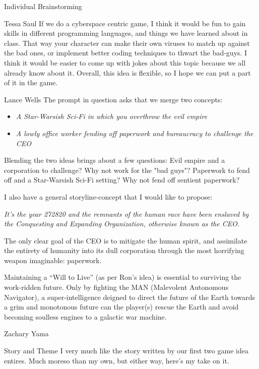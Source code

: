 \documentclass[12pt]{report}
\begin{document}
\begin{section}{Individual Brainstorming}
\begin{subsection}{Tessa Saul}
If we do a cyberspace centric game, I think it would be fun to gain skills
in different programming languages, and things we have learned about in
class. That way your character can make their own viruses to match up
against the bad ones, or implement better coding techniques to thwart the
bad-guys. I think it would be easier to come up with jokes about this topic
because we all already know about it. Overall, this idea is flexible, so I
hope we can put a part of it in the game.
\end{subsection}

\begin{subsection}{Lance Wells}
The prompt in question asks that we merge two concepts:
\begin{itemize}
\item \emph{A Star-Warsish Sci-Fi in which you overthrow the evil empire}
\item \emph{A lowly office worker fending off paperwork and bureaucracy to challenge the CEO}
\end{itemize}

Blending the two ideas brings about a few questions:
Evil empire and a corporation to challenge? Why not work for the "bad guys"?
Paperwork to fend off and a Star-Warsish Sci-Fi setting? Why not fend off 
sentient paperwork?

I also have a general storyline-concept that I would like to propose:

\begin{center}
\emph{It's the year 272820 and the remnants of the human race have been
enslaved by the Conquesting and Expanding Organization, otherwise known as
the CEO.}
\end{center}

The only clear goal of the CEO is to mitigate the human spirit, and
assimilate the entirety of humanity into its dull corporation through the
most horrifying weapon imaginable: paperwork.

Maintaining a ``Will to Live'' (as per Ron's idea) is essential to surviving
the work-ridden future. Only by fighting the MAN (Malevolent Autonomous
Navigator), a super-intelligence deigned to direct the future of the Earth
towards a grim and monotonous future can the player(s) rescue the Earth and
avoid becoming soulless engines to a galactic war machine.
\end{subsection}

\begin{subsection}{Zachary Yama}
\begin{subsubsection}{Story and Theme}
I very much like the story written by our first two game idea entires. Much
moreso than my own, but either way, here's my take on it.


\end{subsubsection}
\end{subsection}
\end{section}
\end{document}
